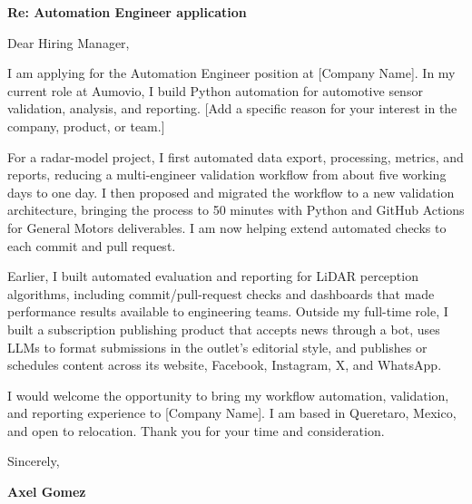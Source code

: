 


\textbf{Re: Automation Engineer application}

Dear Hiring Manager,

I am applying for the Automation Engineer position at [Company Name]. In my current role at Aumovio, I build Python automation for automotive sensor validation, analysis, and reporting. [Add a specific reason for your interest in the company, product, or team.]

For a radar-model project, I first automated data export, processing, metrics, and reports, reducing a multi-engineer validation workflow from about five working days to one day. I then proposed and migrated the workflow to a new validation architecture, bringing the process to 50 minutes with Python and GitHub Actions for General Motors deliverables. I am now helping extend automated checks to each commit and pull request.

Earlier, I built automated evaluation and reporting for LiDAR perception algorithms, including commit/pull-request checks and dashboards that made performance results available to engineering teams. Outside my full-time role, I built a subscription publishing product that accepts news through a bot, uses LLMs to format submissions in the outlet's editorial style, and publishes or schedules content across its website, Facebook, Instagram, X, and WhatsApp.

I would welcome the opportunity to bring my workflow automation, validation, and reporting experience to [Company Name]. I am based in Queretaro, Mexico, and open to relocation. Thank you for your time and consideration.

\vspace{12pt}
Sincerely,

\vspace{8pt}
\textbf{Axel Gomez}
